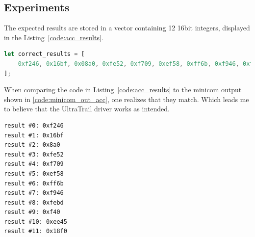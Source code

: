 \subsection{Experiments}

The expected results are stored in a vector containing 12 16bit integers, displayed in the Listing~\ref{code:acc_results}.

\begin{minipage}{\textwidth}
\begin{lstlisting}[style=colorEX,language=Rust,caption={The expected results from the driver test},label={code:acc_results}]
let correct_results = [
    0xf246, 0x16bf, 0x08a0, 0xfe52, 0xf709, 0xef58, 0xff6b, 0xf946, 0xfebd, 0x0f40, 0xee45, 0x18f0,
];
\end{lstlisting}
\end{minipage}

When comparing the code in Listing~\ref{code:acc_results} to the minicom output shown in \ref{code:minicom_out_acc},
one realizes that they match. Which leads me to believe that the UltraTrail driver works as intended.

\begin{minipage}{\textwidth}
\begin{lstlisting}[style=colorEx,caption={Minicom output after executing the driver test},label={code:minicom_out_acc}]
result #0: 0xf246
result #1: 0x16bf
result #2: 0x8a0
result #3: 0xfe52
result #4: 0xf709
result #5: 0xef58
result #6: 0xff6b
result #7: 0xf946
result #8: 0xfebd
result #9: 0xf40
result #10: 0xee45
result #11: 0x18f0
\end{lstlisting}
\end{minipage}
